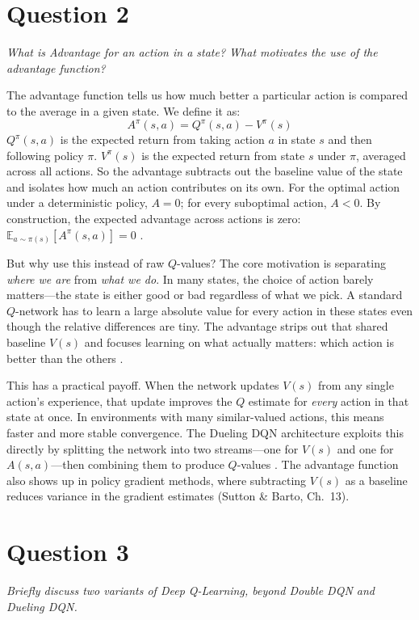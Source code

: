 \documentclass[letterpaper]{article}
\begin{document}
\section*{Question 2}
\textit{What is Advantage for an action in a state? What motivates the use of the advantage function?}

\vspace{0.5em}

The advantage function tells us how much better a particular action is compared to the average in a given state. We define it as:
\begin{equation}
A^{\pi}(s, a) = Q^{\pi}(s, a) - V^{\pi}(s)
\end{equation}
$Q^{\pi}(s, a)$ is the expected return from taking action $a$ in state $s$ and then following policy $\pi$. $V^{\pi}(s)$ is the expected return from state $s$ under $\pi$, averaged across all actions. So the advantage subtracts out the baseline value of the state and isolates how much an action contributes on its own. For the optimal action under a deterministic policy, $A = 0$; for every suboptimal action, $A < 0$. By construction, the expected advantage across actions is zero: $\mathbb{E}_{a \sim \pi(s)}[A^{\pi}(s, a)] = 0$ \citep{wang2016dueling}.

But why use this instead of raw $Q$-values? The core motivation is separating \textit{where we are} from \textit{what we do}. In many states, the choice of action barely matters---the state is either good or bad regardless of what we pick. A standard $Q$-network has to learn a large absolute value for every action in these states even though the relative differences are tiny. The advantage strips out that shared baseline $V(s)$ and focuses learning on what actually matters: which action is better than the others \citep{wang2016dueling}.

This has a practical payoff. When the network updates $V(s)$ from any single action's experience, that update improves the $Q$ estimate for \textit{every} action in that state at once. In environments with many similar-valued actions, this means faster and more stable convergence. The Dueling DQN architecture exploits this directly by splitting the network into two streams---one for $V(s)$ and one for $A(s,a)$---then combining them to produce $Q$-values \citep{wang2016dueling}. The advantage function also shows up in policy gradient methods, where subtracting $V(s)$ as a baseline reduces variance in the gradient estimates (Sutton \& Barto, Ch.~13).

\section*{Question 3}
\textit{Briefly discuss two variants of Deep Q-Learning, beyond Double DQN and Dueling DQN.}
\end{document}
